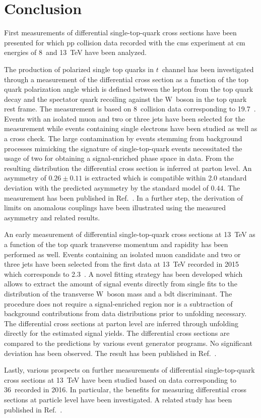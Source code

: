  \chapter{Conclusion}
\label{ch:conclusion}

First measurements of differential single-top-quark cross sections have been presented for which \acrlong{pp} collision data recorded with the \gls{cms} experiment at \acrlong{cm} energies of 8~and 13~TeV have been analyzed.

The production of polarized single top quarks in $t$~channel has been investigated through a measurement of the differential cross section as a function of the top quark polarization angle which is defined between the lepton from the top quark decay and the spectator quark recoiling against the W~boson in the top quark rest frame. The measurement is based on 8~\TeV collision data corresponding to 19.7~\invfb. Events with an isolated muon and two or three jets have been selected for the measurement while events containing single electrons have been studied as well as a cross check. The large contamination by events stemming from background processes mimicking the signature of single-top-quark events necessitated the usage of two  for obtaining a signal-enriched phase space in data. From the resulting distribution the differential cross section is inferred at parton level. An asymmetry of $0.26\pm 0.11$ is extracted which is compatible within 2.0 standard deviation with the predicted asymmetry by the standard model of $0.44$. The measurement has been published in Ref.~\cite{Khachatryan:2015dzz}. In a further step, the derivation of limits on anomalous couplings have been illustrated using the measured asymmetry and related results.

An early measurement of differential single-top-quark cross sections at 13~TeV as a function of the top quark transverse momentum and rapidity has been performed as well. Events containing an isolated muon candidate and two or three jets have been selected from the first data at 13~TeV recorded in 2015 which corresponds to 2.3~\invfb. A novel fitting strategy has been developed which allows to extract the amount of signal events directly from single fits to the distribution of the transverse W~boson mass and a \gls{bdt} discriminant. The procedure does not require a signal-enriched region nor is a subtraction of background contributions from data distributions prior to unfolding necessary. The differential cross sections at parton level are inferred through unfolding directly for the estimated signal yields. The differential cross sections are compared to the predictions by various event generator programs. No significant deviation has been observed. The result has been published in Ref.~\cite{CMS-PAS-TOP-16-004}.

Lastly, various prospects on further measurements of differential single-top-quark cross sections at 13~TeV have been studied based on data corresponding to 36~\invfb recorded in 2016. In particular, the benefits for measuring differential cross sections at particle level have been investigated. A related study has been published in Ref.~\cite{particleStudies}.
